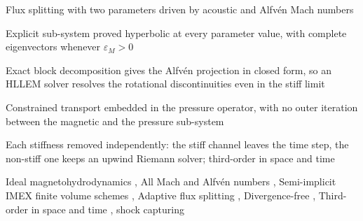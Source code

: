 \documentclass[a4paper,fleqn]{cas-sc}
\theoremstyle{remark}
\newcommand{\eps}{\varepsilon}
\newcommand{\epsM}{\eps_{M}}
\begin{document}
\begin{abstract}
momentum; both are embedded in the pressure operator, so that each stage
solves for a magnetic predictor and then for the pressure, without an outer
iteration between the two, with a magnetic field that is divergence-free to
machine precision and with the total energy conserved without re-solving for
the pressure. Pressure positivity is enforced by a nested Newton iteration on
a second-order M-matrix operator, the fourth-order solution being recovered by
defect correction. Numerical experiments on standard benchmarks, from the
near-incompressible to the supersonic regime, confirm the design third order of
the scheme---approached from below at unit background density and exceeded in
the stiff regime---together with the asymptotic-preserving behaviour, a time
step larger than the explicit one by four orders of magnitude at the lowest
Mach number considered, positivity of density and pressure, and a magnetic
field divergence-free to round-off.
\end{abstract}


\begin{highlights}
\item Flux splitting with two parameters driven by acoustic and Alfv\'en Mach numbers
\item Explicit sub-system proved hyperbolic at every parameter value, with complete eigenvectors whenever $\epsM>0$
\item Exact block decomposition gives the Alfv\'en projection in closed form, so an HLLEM solver resolves the rotational discontinuities even in the stiff limit
\item Constrained transport embedded in the pressure operator, with no outer iteration between the magnetic and the pressure sub-system
\item Each stiffness removed independently: the stiff channel leaves the time step, the non-stiff one keeps an upwind Riemann solver; third-order in space and time
\end{highlights}


\begin{keywords}
Ideal magnetohydrodynamics \sep
All Mach and Alfv\'en numbers \sep
Semi-implicit IMEX finite volume schemes \sep
Adaptive flux splitting \sep
Divergence-free \sep
Third-order in space and time \sep
shock capturing
\end{keywords}
\end{document}
